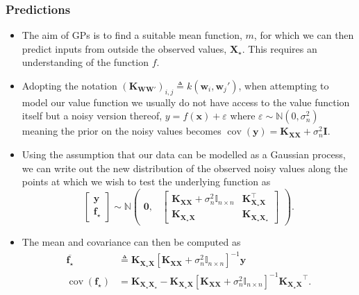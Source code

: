 \documentclass[9pt,hyperref={pdfpagelabels=false},xcolor=table]{beamer}
\begin{document}
\begin{frame}
    \frametitle{Predictions}
    \begin{itemize}
        \item The aim of GPs is to find a suitable mean function, $m$, for which we can then predict inputs from outside the observed values, $\bm{X_{\star}}$. This requires an understanding of the function $f$.
        \item Adopting the notation $\left( \bm{K}_{\bm{W} \bm{W}'} \right)_{i,j} \triangleq k \left( \bm{w}_i , \bm{w}_j' \right)$, when attempting to model our value function we usually do not have access to the value function itself but a noisy version thereof, $y = f(\bm{x}) + \varepsilon$ where $\varepsilon \sim \mathbb{N} (0, \sigma_n^2)$ meaning the prior on the noisy values becomes $\operatorname{cov} (\bm{y}) = \bm{K_{XX}} + \sigma_n^2 \bm{I}$.
        \item Using the assumption that our data can be modelled as a Gaussian process, we can write out the new distribution of the observed noisy values along the points at which we wish to test the underlying function as
              \[
                  \begin{bmatrix}
                      \bm{y} \\
                      \bm{f}_{\star}
                  \end{bmatrix}
                  \sim \mathbb{N}
                  \begin{pmatrix}
                      \bm{0}, &
                      {
                              \begin{bmatrix}
                                  \bm{K_{XX}} + \sigma_n^2 \mathbb{I}_{n \times n} & \bm{K_{X_{\star}X}^{\intercal}} \\
                                  \bm{K_{X_{\star}X}}                              & \bm{K_{X_{\star}X_{\star}}}
                              \end{bmatrix}
                          }
                  \end{pmatrix}.
              \]
        \item The mean and covariance can then be computed as
              \begin{align*}
                  \overline{\bm{f}_{\star}}           & \triangleq \bm{K_{X_{\star}X}} \left[ \bm{K_{XX}} + \sigma_n^2 \mathbb{I}_{n \times n} \right]^{-1} \bm{y}                                                \\
                  \operatorname{cov} (\bm{f}_{\star}) & = \bm{K_{X_{\star}X_{\star}}} - \bm{K_{X_{\star}X}} \left[ \bm{K_{XX}} + \sigma_n^2 \mathbb{I}_{n \times n} \right]^{-1} \bm{K_{X_{\star}X}}^{\intercal}.
              \end{align*}
    \end{itemize}
\end{frame}
\end{document}
